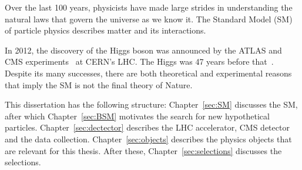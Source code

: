 

\label{sec:introduction}

Over the last 100 years, physicists have made large strides in understanding the natural laws that govern the universe as we know it. The Standard Model (SM) of particle physics describes matter and its interactions.

In 2012, the discovery of the Higgs boson was announced by the ATLAS and CMS experiments~\cite{Higgs_discovery_2012_CMS,Higgs_discovery_2012_ATLAS,Higgs_discovery_2013_CMS} at CERN's LHC.
The Higgs was 47 years before that~\cite{Higgs_theory1,Higgs_theory2}.
Despite its many successes, there are both theoretical and experimental reasons that imply the SM is not the final theory of Nature.

This dissertation has the following structure:
Chapter~\ref{sec:SM} discusses the SM, after which Chapter~\ref{sec:BSM} motivates the search for new hypothetical particles.
Chapter~\ref{sec:dectector} describes the LHC accelerator, CMS detector and the data collection.
Chapter~\ref{sec:objects} describes the physics objects that are relevant for this thesis.
After these, Chapter~\ref{sec:selections} discusses the selections.
